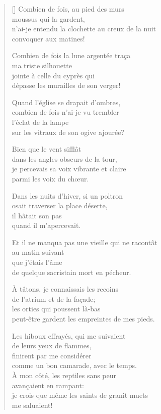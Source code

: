 \documentclass[a4paper,12pt]{book}
\begin{document}
\begin{verse}[\versewidth]
  Combien de fois, au pied des murs \\
  moussus qui la gardent, \\
  n'ai-je entendu la clochette au creux de la nuit \\
  convoquer aux matines!

  Combien de fois la lune argentée traça \\
  ma triste silhouette \\
  jointe à celle du cyprès qui \\
  dépasse les murailles de son verger!

  Quand l'église se drapait d'ombres, \\
  combien de fois n'ai-je vu trembler \\
  l'éclat de la lampe \\
  sur les vitraux de son ogive ajourée?

  Bien que le vent sifflât \\
  dans les angles obscurs de la tour, \\
  je percevais sa voix vibrante et claire \\
  parmi les voix du chœur.

  Dans les nuits d'hiver, si un poltron \\
  osait traverser la place déserte, \\
  il hâtait son pas \\
  quand il m'apercevait.

  Et il ne manqua pas une vieille qui ne racontât \\
  au matin suivant \\
  que j'étais l'âme \\
  de quelque sacristain mort en pécheur.

  À tâtons, je connaissais les recoins \\
  de l'atrium et de la façade; \\
  les orties qui poussent là-bas \\
  peut-être gardent les empreintes de mes pieds.

  Les hiboux effrayés, qui me suivaient \\
  de leurs yeux de flammes, \\
  finirent par me considérer \\
  comme un bon camarade, avec le temps. \\

  À mon côté, les reptiles sans peur \\
  avançaient en rampant: \\
  je crois que même les saints de granit muets \\
  me saluaient!
\end{verse}
\end{document}
